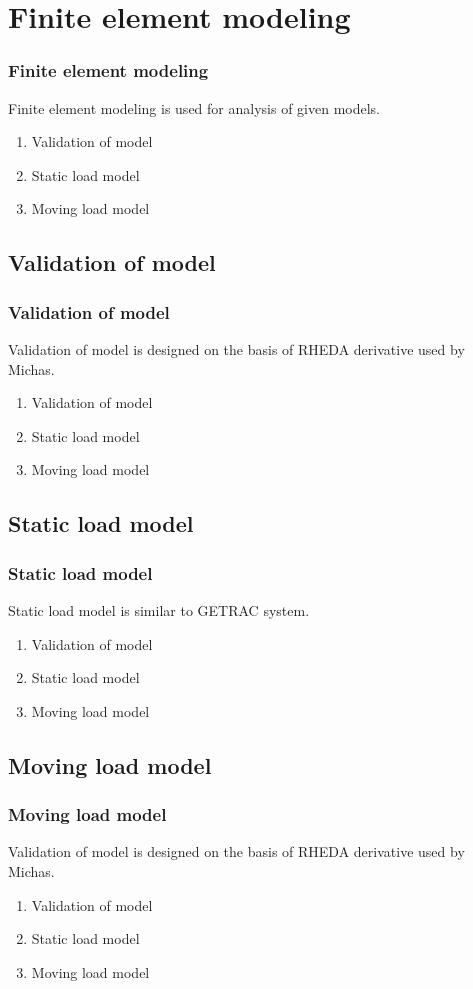 \section{Finite element modeling}
\begin{frame}
	\frametitle{Finite element modeling}
	Finite element modeling is used for analysis of given models.
	\begin{enumerate}
		\item Validation of model
		\item Static load model
		\item Moving load model
	\end{enumerate}
\end{frame}

\subsection{Validation of model}
\begin{frame}
	\frametitle{Validation of model}
	Validation of model is designed on the basis of RHEDA derivative used by Michas.
	\begin{enumerate}
		\item Validation of model
		\item Static load model
		\item Moving load model
	\end{enumerate}
\end{frame}

\subsection{Static load model}
\begin{frame}
	\frametitle{Static load model}
	Static load model is similar to GETRAC system.
	\begin{enumerate}
		\item Validation of model
		\item Static load model
		\item Moving load model
	\end{enumerate}
\end{frame}

\subsection{Moving load model}
\begin{frame}
	\frametitle{Moving load model}
	Validation of model is designed on the basis of RHEDA derivative used by Michas.
	\begin{enumerate}
		\item Validation of model
		\item Static load model
		\item Moving load model
	\end{enumerate}
\end{frame}